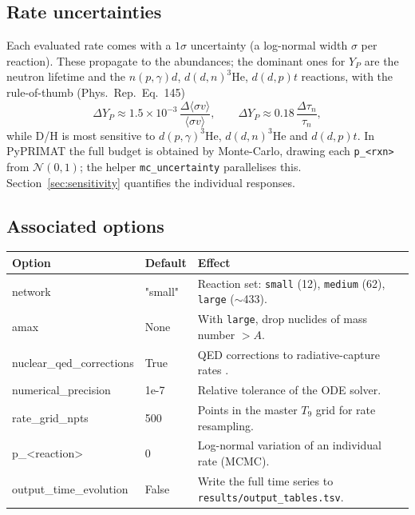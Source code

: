 \documentclass[11pt,a4paper]{article}
\newcommand{\YP}{Y_P}
\newcommand{\sigmav}{\langle\sigma v\rangle}
\newcommand{\code}[1]{\texttt{#1}}
\newcommand{\PR}{Phys.\ Rep.}
\begin{document}
\subsection{Rate uncertainties}
Each evaluated rate comes with a $1\sigma$ uncertainty (a log-normal width
$\sigma$ per reaction). These propagate to the abundances; the dominant ones for
$\YP$ are the neutron lifetime and the $n(p,\gamma)d$, $d(d,n)^3$He,
$d(d,p)t$ reactions, with the rule-of-thumb (\PR\ Eq.~145)
\begin{equation}
  \Delta\YP \approx 1.5\times10^{-3}\,
     \frac{\Delta\sigmav}{\sigmav}, \qquad
  \Delta\YP \approx 0.18\,\frac{\Delta\tau_n}{\tau_n},
\end{equation}
while D/H is most sensitive to $d(p,\gamma)^3$He, $d(d,n)^3$He and $d(d,p)t$. In
PyPRIMAT the full budget is obtained by Monte-Carlo, drawing each \code{p\_<rxn>}
from $\mathcal N(0,1)$; the helper \code{mc\_uncertainty} parallelises this.
Section~\ref{sec:sensitivity} quantifies the individual responses.

\subsection{Associated options}
\begin{center}\small
\begin{tabular}{>{\ttfamily}l l >{\raggedright\arraybackslash}p{8.4cm}}
\toprule
\normalfont Option & Default & Effect \\
\midrule
network                 & "small" & Reaction set: \code{small} (12), \code{medium} (62), \code{large} ($\sim$433). \\
amax                    & None    & With \code{large}, drop nuclides of mass number $> A$. \\
nuclear\_qed\_corrections & True  & QED corrections to radiative-capture rates \cite{PitrouPospelov2020}. \\
numerical\_precision    & 1e-7    & Relative tolerance of the ODE solver. \\
rate\_grid\_npts        & 500     & Points in the master $T_9$ grid for rate resampling. \\
p\_<reaction>           & 0       & Log-normal variation of an individual rate (MCMC). \\
output\_time\_evolution & False   & Write the full time series to \code{results/output\_tables.tsv}. \\
\bottomrule
\end{tabular}
\end{center}
\end{document}
